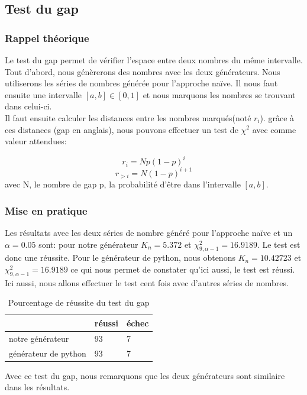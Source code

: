 \documentclass[french]{article}
\begin{document}
\subsection{Test du gap}
\subsubsection{Rappel théorique}
Le test du gap permet de vérifier l'espace entre deux nombres du même intervalle.\\
Tout d'abord, nous génèrerons des nombres avec les deux générateurs. Nous utiliserons les séries de nombres générée pour l'approche naïve.
Il nous faut ensuite une intervalle $[a,b]\in[0,1]$ et nous marquons les nombres se trouvant dans celui-ci.\\ Il faut ensuite calculer les distances entre les nombres marqués(noté $r_i$).
grâce à ces distances (gap en anglais), nous pouvons effectuer un test de $\chi^2$ avec comme valeur attendues:

\[
	r_i = N p (1-p)^i
\] 
\[
	r_{>i} = N (1-p)^{i+1}
\]
avec N, le nombre de gap
p, la probabilité d'être dans l'intervalle $[a,b]$.
\subsubsection{Mise en pratique}
Les résultats avec les deux séries de nombre généré pour l'approche naïve et un $\alpha=0.05$ sont: pour notre générateur  $K_n =5.372$ et $\chi^{2}_{9,\alpha-1} = 16.9189$. Le test est donc une réussite.
Pour le générateur de python, nous obtenons $K_n =10.42723$ et $\chi^{2}_{9,\alpha-1} = 16.9189$ ce qui nous permet de constater qu'ici aussi, le test est réussi.\\
Ici aussi, nous allons effectuer le test cent fois avec d'autres séries de nombres.

\begin{table}[!h]
\centering
\caption{Pourcentage de réussite du test du gap }
\label{pourcentgap}
\begin{tabular}{l|l|l|}
\cline{2-3}
                                           & réussi & échec \\ \hline
\multicolumn{1}{|l|}{notre générateur}     & 93     & 7    \\ \hline
\multicolumn{1}{|l|}{générateur de python} & 93     & 7     \\ \hline
\end{tabular}
\end{table}
Avec ce test du gap, nous remarquons que les deux générateurs sont similaire dans les résultats. 
\end{document}
